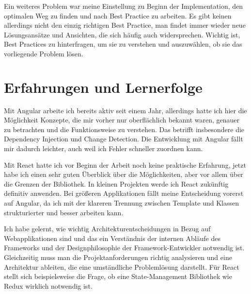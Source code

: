 Ein weiteres Problem war meine Einstellung zu Beginn der Implementation, den optimalen Weg zu finden und nach Best Practice zu arbeiten. Es gibt keinen allerdings nicht den einzig richtigen Best Practice, man findet immer wieder neue Lösungsansätze und Ansichten, die sich häufig auch widersprechen. Wichtig ist, Best Practices zu hinterfragen, um sie zu verstehen und auszuwählen, ob sie das vorliegende Problem lösen.

\section{Erfahrungen und Lernerfolge}
Mit Angular arbeite ich bereits aktiv seit einem Jahr, allerdings hatte ich hier die Möglichkeit Konzepte, die mir vorher nur oberflächlich bekannt waren, genauer zu betrachten und die Funktionsweise zu verstehen. Das betrifft insbesondere die Dependency Injection und Change Detection. Die Entwicklung mit Angular fällt mir dadurch leichter, auch weil ich Fehler schneller zuordnen kann.

Mit React hatte ich vor Beginn der Arbeit noch keine praktische Erfahrung, jetzt habe ich einen sehr guten Überblick über die Möglichkeiten, aber vor allem über die Grenzen der Bibliothek. In kleinen Projekten werde ich React zukünftig definitiv anwenden. Bei größeren Applikationen fällt meine Entscheidung vorerst auf Angular, da ich mit der klareren Trennung zwischen Template und Klassen strukturierter und besser arbeiten kann. 

Ich habe gelernt, wie wichtig Architekturentscheidungen in Bezug auf Webapplikationen sind und das ein Verständnis der internen Abläufe des Frameworks und der Designphilosophie der Framework-Entwickler notwendig ist. Gleichzeitig muss man die Projektanforderungen richtig analysieren und eine Architektur ableiten, die eine umständliche Problemlösung darstellt. Für React stellt sich beispielsweise die Frage, ob eine State-Management Bibliothek wie Redux wirklich notwendig ist.

\newpage